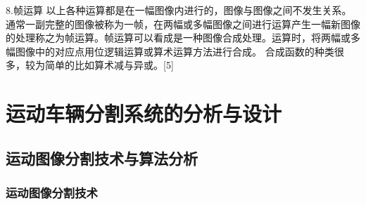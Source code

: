\documentclass[18pt, twoside, a4paper, dvipdfm]{book}
\begin{document}
8.帧运算
以上各种运算都是在一幅图像内进行的，图像与图像之间不发生关系。通常一副完整的图像被称为一帧，在两幅或多幅图像之间进行运算产生一幅新图像的处理称之为帧运算。帧运算可以看成是一种图像合成处理。运算时，将两幅或多幅图像中的对应点用位逻辑运算或算术运算方法进行合成。
合成函数的种类很多，较为简单的比如算术减与异或。[5]

\chapter{运动车辆分割系统的分析与设计}
\section{运动图像分割技术与算法分析}
\subsection{运动图像分割技术}
	
\end{document}
